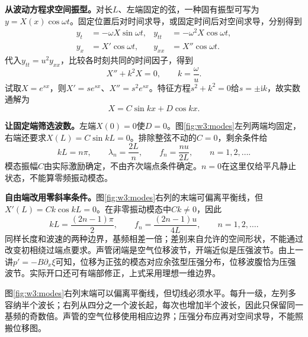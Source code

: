 \textbf{从波动方程求空间振型。}对长$L$、左端固定的弦，一种固有振型可写为$y=X(x)\cos\omega t$。固定位置后对时间求导，或固定时间后对空间求导，分别得到
\[
 \begin{aligned}
 y_t&=-\omega X\sin\omega t,&y_{tt}&=-\omega^2X\cos\omega t,\\
 y_x&=X'\cos\omega t,&y_{xx}&=X''\cos\omega t.
 \end{aligned}
\]
代入$y_{tt}=u^2y_{xx}$，比较各时刻共同的时间因子，得到
\[
 X''+k^2X=0,\qquad k=\frac\omega u.
\]
试取$X=e^{sx}$，则$X'=se^{sx}$、$X''=s^2e^{sx}$。特征方程$s^2+k^2=0$给$s=\pm\mathrm ik$，故实数通解为
\[
 X=C\sin kx+D\cos kx.
\]

\textbf{让固定端筛选波数。}左端$X(0)=0$使$D=0$。图\ref{fig:w3:modes}左列两端均固定，右端还要求$X(L)=C\sin kL=0$。排除整弦不动的$C=0$，剩余条件给
\[
 kL=n\pi,\qquad \lambda_n=\frac{2L}{n},\qquad
 f_n=\frac{nu}{2L},\qquad n=1,2,\ldots.
\]
模态振幅$C$由实际激励确定，不由齐次端点条件确定。$n=0$在这里仅给平凡静止状态，不能算零频振动模态。

\textbf{自由端改用零斜率条件。}图\ref{fig:w3:modes}右列的末端可偏离平衡线，但$X'(L)=Ck\cos kL=0$。在非零振动模态中$Ck\ne0$，因此
\[
 kL=\frac{(2n-1)\pi}{2},\qquad
 f_n=\frac{(2n-1)u}{4L},\qquad n=1,2,\ldots.
\]
同样长度和波速的两种边界，基频相差一倍；差别来自允许的空间形状，不能通过改变初相绕过端点要求。声管闭端是空气位移波节，开端近似是压强波节。由上一讲$p'=-B\partial_x\xi$可知，位移为正弦的模态对应余弦型压强分布，位移波腹恰为压强波节。实际开口还可有端部修正，上式采用理想一维边界。

图\ref{fig:w3:modes}右列末端可以偏离平衡线，但切线必须水平。每升一级，左列多容纳半个波长；右列从四分之一个波长起，每次也增加半个波长，因此只保留同一基频的奇数倍。声管的空气位移使用相应边界；压强分布应再对空间求导，不能照搬位移图。


